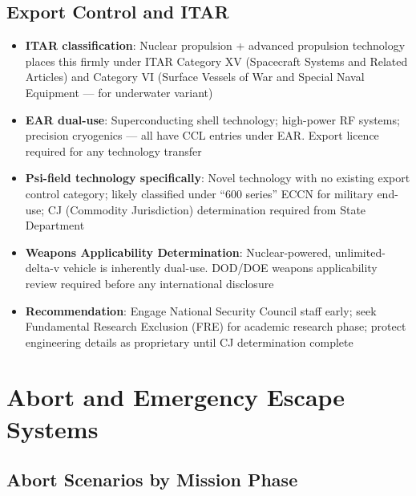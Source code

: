 \documentclass[11pt,a4paper]{article}
\begin{document}
\subsection{Export Control and ITAR}

\begin{itemize}
  \item \textbf{ITAR classification}: Nuclear propulsion + advanced
    propulsion technology places this firmly under ITAR Category XV
    (Spacecraft Systems and Related Articles) and Category VI
    (Surface Vessels of War and Special Naval Equipment --- for
    underwater variant)
  \item \textbf{EAR dual-use}: Superconducting shell technology;
    high-power RF systems; precision cryogenics --- all have CCL
    entries under EAR. Export licence required for any technology
    transfer
  \item \textbf{Psi-field technology specifically}: Novel technology
    with no existing export control category; likely classified under
    ``600 series'' ECCN for military end-use; CJ (Commodity
    Jurisdiction) determination required from State Department
  \item \textbf{Weapons Applicability Determination}: Nuclear-powered,
    unlimited-delta-v vehicle is inherently dual-use. DOD/DOE weapons
    applicability review required before any international disclosure
  \item \textbf{Recommendation}: Engage National Security Council
    staff early; seek Fundamental Research Exclusion (FRE) for
    academic research phase; protect engineering details as
    proprietary until CJ determination complete
\end{itemize}

\section{Abort and Emergency Escape Systems}
\label{sec:abort}

\subsection{Abort Scenarios by Mission Phase}
\end{document}
